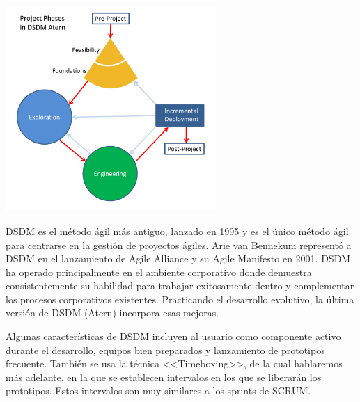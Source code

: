 \documentclass[12pt,a4paper]{article}
\begin{document}
\begin{center}
 \includegraphics[width=0.6\textwidth]{DSDM_Phases.png}
\end{center}

DSDM es el método ágil más antiguo, lanzado en 1995 y es el único método ágil para centrarse en la gestión de proyectos ágiles. Arie van Bennekum representó a DSDM en el lanzamiento de Agile Alliance y su Agile Manifesto en 2001. DSDM ha operado principalmente en el ambiente corporativo donde demuestra consistentemente su habilidad para trabajar exitosamente dentro y complementar los procesos corporativos existentes. Practicando el desarrollo evolutivo, la última versión de DSDM (Atern) incorpora esas mejoras.


Algunas características de DSDM incluyen al usuario como componente activo durante el desarrollo, equipos bien preparados y lanzamiento de prototipos frecuente. También se usa la técnica <<Timeboxing>>, de la cual hablaremos más adelante, en la que se establecen intervalos en los que se liberarán los prototipos. Estos intervalos son muy similares a los sprints de SCRUM.



\end{document}
